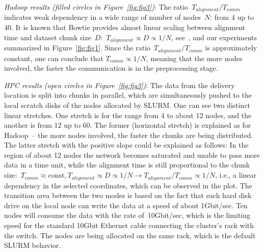 \documentclass[10pt]{article}
\newcommand{\COMMENT}[1]{{\color{red} #1 }}
\begin{document}
\textit{Hadoop results (filled circles in Figure~\ref{fig:fig3})}: The ratio~$T_{alignment}/T_{comm}$ indicates weak dependency in a wide range of number of nodes~$N$: from 4 up to 40. It is known that Bowtie provides almost linear scaling between alignment time and dataset chunk size~$D$:~$T_{alignment}\propto  D\propto 1/N$, see~\cite{Langmead:2009uq}, and our experiments summarized in Figure~\ref{fig:fig1}. Since the ratio~$T_{alignment}/T_{comm}$ is approximately constant, one can conclude that $T_{comm}\propto 1/N$, meaning that the more nodes involved, the faster the communication is in the preprocessing stage.

\textit{HPC results (open circles in Figure~\ref{fig:fig3})}: The data from the delivery location is split into chunks in parallel, which are simultaneously pushed to the local scratch disks of the nodes allocated by SLURM\@. One can see two distinct linear stretches. One stretch is for the range from 4 to about 12 nodes, and the another is from 12 up to 60. The former (horizontal stretch) is explained as for Hadoop~-- the more nodes involved, the faster the chunks are being distributed. The latter stretch with the positive slope could be explained as follows: In the region of about 12 nodes the network becomes saturated
and unable to pass more data in a time unit, while the alignment time is still proportional to the chunk size:~$T_{comm}\approx\mbox{const}, T_{alignment}\propto D\propto 1/N \rightarrow T_{alignment}/T_{comm}\propto 1/N$, i.e., a linear dependency in the selected coordinates, which can be observed in the plot. 
The transition area between the two modes is based on the fact that each hard disk drive on the local node can write the data at a speed of about 1Gbit/sec. Ten nodes will consume the data with the rate of~10Gbit/sec, which is the limiting speed for the standard 10Gbit Ethernet cable connecting the cluster's rack with the switch. The nodes are being allocated on the same rack, which is the default SLURM behavior.
\end{document}
